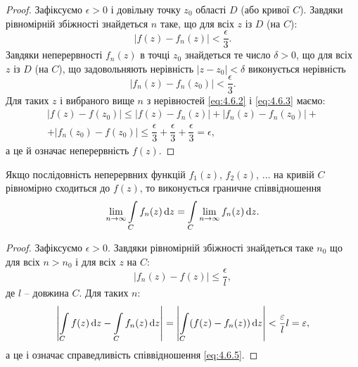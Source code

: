 \begin{proof}
Зафіксуємо $\epsilon > 0$ і довільну точку $z_0$ області $D$ (або кривої $C$). Завдяки рівномірній збіжності знайдеться $n$ таке, що для всіх $z$ із $D$ (на $C$):
\begin{equation}
	\label{eq:4.6.2}
	|f(z) - f_n(z)| < \dfrac{\epsilon}{3}.
\end{equation}
Завдяки неперервності $f_n(z)$ в точці $z_0$ знайдеться те число $\delta > 0$, що для всіх $z$ із $D$ (на $C$), що задовольняють нерівність $|z - z_0| < \delta$ виконується нерівність
\begin{equation}
	\label{eq:4.6.3}
	|f_n(z) - f_n(z_0)| < \dfrac{\epsilon}{3}.
\end{equation}
Для таких $z$ і вибраного вище $n$ з нерівностей \eqref{eq:4.6.2} і \eqref{eq:4.6.3} маємо:
\begin{multline}
	\label{eq:4.6.4}
	|f(z) - f(z_0)| \le |f(z) - f_n(z)| + |f_n(z) - f_n(z_0)| + \\ + |f_n(z_0) - f(z_0)| \le \dfrac{\epsilon}{3} + \dfrac{\epsilon}{3} + \dfrac{\epsilon}{3} = \epsilon,
\end{multline} а це й означає неперервність $f(z)$.
\end{proof}

\begin{theorem}
	\label{th:4.6.2}
	Якщо послідовність неперервних функцій $f_1(z)$, $f_2(z)$, $\ldots$ на кривій $C$ рівномірно сходиться до $f(z)$, то виконується граничне співвідношення
	\begin{equation}
		\label{eq:4.6.5}
		\displaystyle\lim\limits_{n \to \infty} \displaystyle\int\limits_C f_n(z) \mathop{}\!\mathrm{d} z = \displaystyle\int\limits_C \displaystyle\lim\limits_{n \to \infty} f_n(z) \mathop{}\!\mathrm{d} z.
	\end{equation}
\end{theorem}

\begin{proof}
Зафіксуємо $\epsilon > 0$. Завдяки рівномірній збіжності знайдеться таке $n_0$ що для всіх $n > n_0$ і для всіх $z$ на $C$:
\begin{equation}
	\label{eq:4.6.6}
	|f_n(z) - f(z)| \le \dfrac{\epsilon}{l},
\end{equation}
де $l$ -- довжина $C$. Для таких $n$:
\begin{equation}
	\label{eq:4.6.7}
	\left| \displaystyle\int\limits_C f(z) \mathop{}\!\mathrm{d} z - \displaystyle\int\limits_C f_n(z) \mathop{}\!\mathrm{d} z \right| = \left| \displaystyle\int\limits_C (f(z) - f_n(z)) \mathop{}\!\mathrm{d} z \right| < \dfrac{\varepsilon}{l} l = \varepsilon,
\end{equation}
а це і означає справедливість співвідношення \eqref{eq:4.6.5}.
\end{proof}

